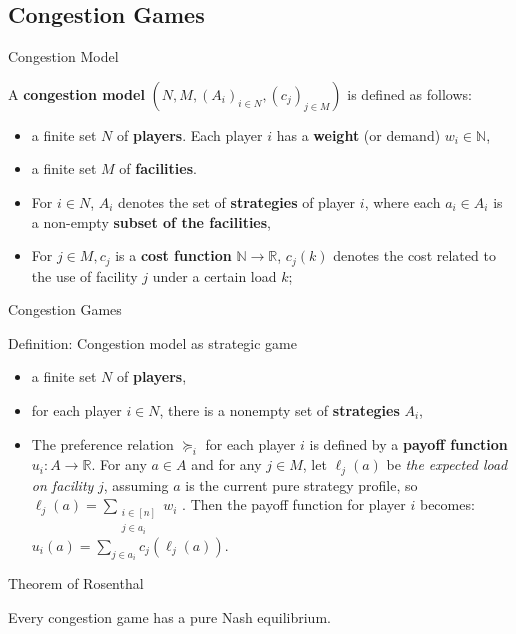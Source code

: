 \documentclass{beamer}
\newcommand{\R}{\mathbb{R}}
\newcommand{\N}{\mathbb{N}}
\begin{document}
\subsection{Congestion Games}
\begin{frame}{Congestion Model}
\begin{definition}
A \textbf{congestion model} $(N, M, (A_i)_{i\in N}, (c_j)_{j\in M})$ is defined as follows:
\begin{itemize}
  \item a finite set $N$ of \textbf{players}. Each player $i$ has a \textbf{weight} (or demand) $w_i \in \N$,
  \item a finite set $M$ of \textbf{facilities}.
  \item For $i \in N$, $A_i$ denotes the set of \textbf{strategies} of player $i$, where each $a_i \in A_i$ is a non-empty \textbf{subset of the facilities},
  \item For $j \in M, c_j$  is a \textbf{cost function} $\N \rightarrow \R$, $c_j(k)$ denotes the cost related to the use of facility $j$ under a certain load $k$;
\end{itemize}
\end{definition}
\end{frame}
\begin{frame}{Congestion Games}
\begin{block}{Definition: Congestion model as strategic game}
\begin{itemize}
 \item a finite set $N$ of \textbf{players},
 \item for each player $i \in N$, there is a nonempty set of  \textbf{strategies} $A_i$,
 \item The preference relation $\succeq_i$ for each player $i$ is defined by a \textbf{payoff function} $u_i: A \rightarrow \R$. For any $a \in A$ and for any $j \in M$, let $\ell_j(a)$ be \emph{the expected load on facility} $j$, assuming $a$ is the current pure strategy profile, so $\ell_j(a) = \sum_{\substack{i \in [n]\\j \in a_i}}{w_i}$ . Then the payoff function for player $i$ becomes: $u_i(a) = \sum_{j\in a_i} c_j(\ell_j(a))$.
  \end{itemize}
\end{block}
\end{frame}
\begin{frame}{Theorem of Rosenthal}
\begin{theorem}
Every congestion game has a pure Nash equilibrium.
\end{theorem}
\end{frame}
\end{document}
